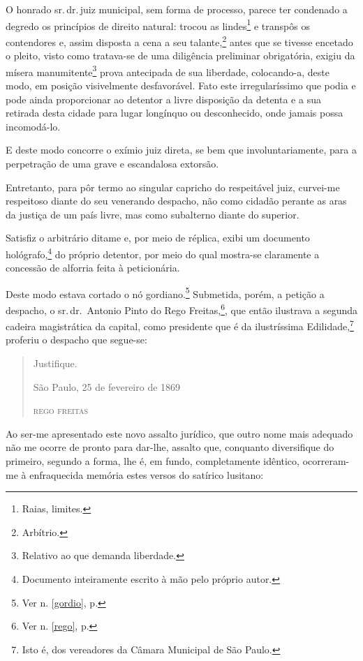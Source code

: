 O honrado sr.\,dr.\,juiz municipal, sem forma de processo, parece ter
condenado a degredo os princípios de direito natural: trocou as
lindes\footnote{Raias, limites.} e transpôs os contendores e, assim
disposta a cena a seu talante,\footnote{Arbítrio.} antes que se
tivesse encetado o pleito, visto como tratava-se de uma diligência
preliminar obrigatória, exigiu da mísera manumitente\footnote{Relativo
  ao que demanda liberdade.} prova antecipada de sua liberdade,
colocando-a, deste modo, em posição visivelmente desfavorável. Fato este
irregularíssimo que podia e pode ainda proporcionar ao detentor a livre
disposição da detenta e a sua retirada desta cidade para lugar longínquo
ou desconhecido, onde jamais possa incomodá-lo.

E deste modo concorre o exímio juiz direta, se bem que
involuntariamente, para a perpetração de uma grave e escandalosa
extorsão.

Entretanto, para pôr termo ao singular capricho do respeitável juiz,
curvei-me respeitoso diante do seu venerando despacho, não como cidadão
perante as aras da justiça de um país livre, mas como subalterno diante
do superior.

Satisfiz o arbitrário ditame e, por meio de réplica, exibi um documento
hológrafo,\footnote{Documento inteiramente escrito à mão pelo próprio
  autor.} do próprio detentor, por meio do qual mostra-se claramente a
concessão de alforria feita à peticionária.

Deste modo estava cortado o nó gordiano.\footnote{Ver n. \ref{gordio}, p. 
\pageref{gordio}} Submetida, porém, a petição a despacho, o sr.\,dr.~Antonio 
Pinto do Rego Freitas,\footnote{Ver n. \ref{rego}, p. \pageref{rego}}, 
que então ilustrava a segunda cadeira magistrática da capital, como presidente 
que é da ilustríssima Edilidade,\footnote{Isto é, dos vereadores da 
Câmara Municipal de São Paulo.} proferiu o despacho que segue-se:

\begin{quote}
Justifique.

\begin{flushright}
São Paulo, 25 de fevereiro de 1869

\textsc{rego freitas}
\end{flushright}
\end{quote}

Ao ser-me apresentado este novo assalto jurídico, que outro nome mais
adequado não me ocorre de pronto para dar-lhe, assalto que, conquanto
diversifique do primeiro, segundo a forma, lhe é, em fundo,
completamente idêntico, ocorreram-me à enfraquecida memória estes versos
do satírico lusitano:

